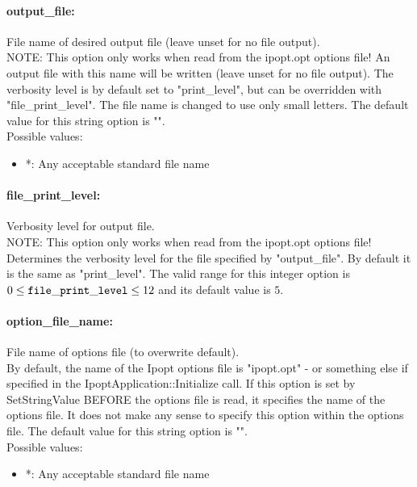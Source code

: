 \paragraph{output\_file:}\label{sec:output_file} File name of desired output file (leave unset for no file output). $\;$ \\
 NOTE: This option only works when read from the
ipopt.opt options file! An output file with this
name will be written (leave unset for no file
output).  The verbosity level is by default set
to "print\_level", but can be overridden with
"file\_print\_level".  The file name is changed
to use only small letters.
The default value for this string option is "".
\\ 
Possible values:
\begin{itemize}
   \item *: Any acceptable standard file name
\end{itemize}

\paragraph{file\_print\_level:}\label{sec:file_print_level} Verbosity level for output file. $\;$ \\
 NOTE: This option only works when read from the
ipopt.opt options file! Determines the verbosity
level for the file specified by "output\_file". 
By default it is the same as "print\_level". The valid range for this integer option is
$0 \le {\tt file\_print\_level } \le 12$
and its default value is $5$.


\paragraph{option\_file\_name:}\label{sec:option_file_name} File name of options file (to overwrite default). $\;$ \\
 By default, the name of the Ipopt options file is
"ipopt.opt" - or something else if specified in
the IpoptApplication::Initialize call. If this
option is set by SetStringValue BEFORE the
options file is read, it specifies the name of
the options file.  It does not make any sense to
specify this option within the options file.
The default value for this string option is "".
\\ 
Possible values:
\begin{itemize}
   \item *: Any acceptable standard file name
\end{itemize}

